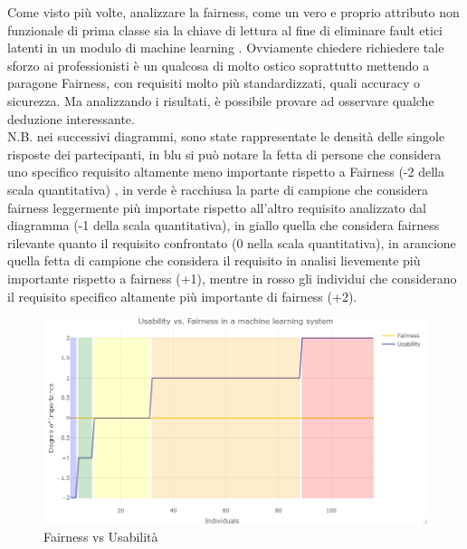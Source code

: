     \begin{center}
		\hspace*{-5mm}%
	\end{center}
	Come visto più volte, analizzare la fairness, come un vero e proprio attributo non funzionale di prima classe sia la chiave di lettura al fine di eliminare fault etici latenti in un modulo di machine learning \cite{brun2018software}. Ovviamente chiedere richiedere tale sforzo ai professionisti è un qualcosa di molto ostico soprattutto mettendo a paragone Fairness, con requisiti molto più standardizzati, quali accuracy o sicurezza. Ma analizzando i risultati, è possibile provare ad osservare qualche deduzione interessante.\\
	
	N.B. nei successivi diagrammi, sono state rappresentate le densità delle singole risposte dei partecipanti, in blu si può notare la fetta di persone che considera uno specifico requisito altamente meno importante rispetto a Fairness (-2 della scala quantitativa) , in verde è racchiusa la parte di campione che considera fairness leggermente più importate rispetto all'altro requisito analizzato dal diagramma (-1 della scala quantitativa), in giallo quella che considera fairness rilevante quanto il requisito confrontato (0 nella scala quantitativa), in arancione quella fetta di campione che considera il requisito in analisi lievemente più importante rispetto a fairness (+1), mentre in rosso gli individui che considerano il requisito specifico altamente più importante di fairness (+2).
	\begin{figure}[h!]
        \centering
        \includegraphics[width=1\textwidth]{figure/Analisi/RQ3/1.Usability_vs_Fairness.png}
        \caption{Fairness vs Usabilità}
    \end{figure}
    
